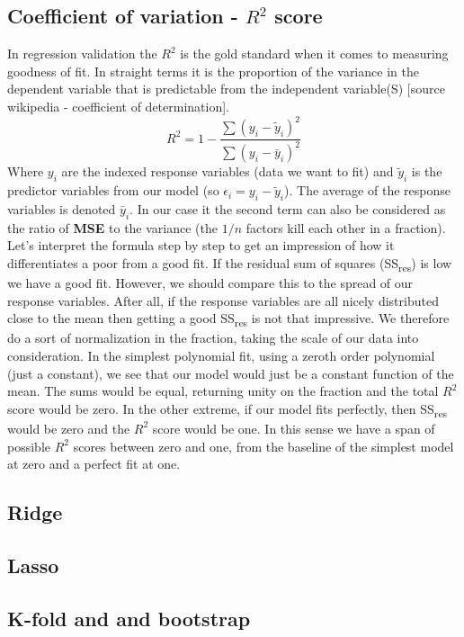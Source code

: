 \subsection{Coefficient of variation - $R^2$ score}
In regression validation the $R^2$ is the gold standard when it comes to measuring goodness of fit. In straight terms it is the proportion of the variance in the dependent variable that is predictable from the independent variable(S) [source wikipedia - coefficient of determination]. 
\begin{equation}\label{eq: R squared}
	R^2 = 1 - \frac{ \sum(y_i-\tilde{y}_i)^2 }{ \sum(y_i-\bar{y}_i)^2 }
\end{equation}
Where $y_i$ are the indexed response variables (data we want to fit) and $\tilde{y}_i$ is the predictor variables from our model (so $\epsilon_i = y_i - \tilde{y}_i$). The average of the response variables is denoted $\bar{y}_i$. In our case it the second term can also be considered as the ratio of \textbf{MSE} to the variance (the $1/n$ factors kill each other in a fraction). Let's interpret the formula step by step to get an impression of how it differentiates a poor from a good fit. If the residual sum of squares (SS\textsubscript{res}) is low we have a good fit. However, we should compare this to the spread of our response variables. After all, if the response variables are all nicely distributed close to the mean then getting a good SS\textsubscript{res} is not that impressive. We therefore do a sort of normalization in the fraction, taking the scale of our data into consideration. In the simplest polynomial fit, using a zeroth order polynomial (just a constant), we see that our model would just be a constant function of the mean. The sums would be equal, returning unity on the fraction and the total $R^2$ score would be zero. In the other extreme, if our model fits perfectly, then SS\textsubscript{res} would be zero and the $R^2$ score would be one. In this sense we have a span of possible $R^2$ scores between zero and one, from the baseline of the simplest model at zero and a perfect fit at one. 
\subsection{Ridge}
\subsection{Lasso}
\subsection{K-fold and and bootstrap}

